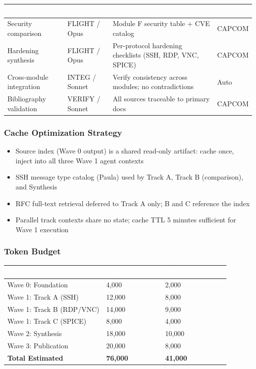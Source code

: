 \documentclass[11pt,letterpaper]{article}
\newcommand{\tableheader}[1]{\textbf{\sffamily\textcolor{white}{#1}}}
\begin{document}
\begin{center}
\begin{tabularx}{\textwidth}{L{3cm}L{2.5cm}XC{2cm}}
\toprule
{}
\tableheader{Task} & \tableheader{Agent} & \tableheader{Output} & \tableheader{Gate} \\
\midrule
Security comparison & FLIGHT / Opus & Module F security table + CVE catalog & CAPCOM \\
Hardening synthesis & FLIGHT / Opus & Per-protocol hardening checklists (SSH, RDP, VNC, SPICE) & CAPCOM \\
Cross-module integration & INTEG / Sonnet & Verify consistency across modules; no contradictions & Auto \\
Bibliography validation & VERIFY / Sonnet & All sources traceable to primary docs & CAPCOM \\
\bottomrule
\end{tabularx}
\end{center}

\subsubsection{Cache Optimization Strategy}

\begin{itemize}
\item Source index (Wave 0 output) is a shared read-only artifact: cache once, inject into all three Wave 1 agent contexts
\item SSH message type catalog (Paula) used by Track A, Track B (comparison), and Synthesis
\item RFC full-text retrieval deferred to Track A only; B and C reference the index
\item Parallel track contexts share no state; cache TTL 5 minutes sufficient for Wave 1 execution
\end{itemize}

\subsubsection{Token Budget}

\begin{center}
\begin{tabularx}{\textwidth}{XC{3cm}C{3cm}}
\toprule
{}
\tableheader{Phase} & \tableheader{Tokens (Input)} & \tableheader{Tokens (Output)} \\
\midrule
Wave 0: Foundation & 4,000 & 2,000 \\
Wave 1: Track A (SSH) & 12,000 & 8,000 \\
Wave 1: Track B (RDP/VNC) & 14,000 & 9,000 \\
Wave 1: Track C (SPICE) & 8,000 & 4,000 \\
Wave 2: Synthesis & 18,000 & 10,000 \\
Wave 3: Publication & 20,000 & 8,000 \\
\midrule
\textbf{Total Estimated} & \textbf{76,000} & \textbf{41,000} \\
\bottomrule
\end{tabularx}
\end{center}
\end{document}
